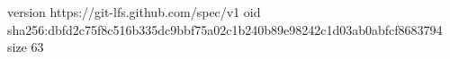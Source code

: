 version https://git-lfs.github.com/spec/v1
oid sha256:dbfd2c75f8c516b335dc9bbf75a02c1b240b89e98242c1d03ab0abfcf8683794
size 63
